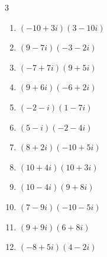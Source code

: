 \begin{multicols}{3}
\begin{enumerate}
        \phantom{$\displaystyle =25-53i$}

  \item $\displaystyle (-10+3i)(3-10i)$

        \phantom{$\displaystyle =109i$}

  \item $\displaystyle (9-7i)(-3-2i)$

        \phantom{$\displaystyle =-41+3i$}

  \item $\displaystyle (-7+7i)(9+5i)$

        \phantom{$\displaystyle =-98+28i$}

  \item $\displaystyle (9+6i)(-6+2i)$

        \phantom{$\displaystyle =-66-18i$}

  \item $\displaystyle (-2-i)(1-7i)$

        \phantom{$\displaystyle =-9+13i$}

  \item $\displaystyle (5-i)(-2-4i)$

        \phantom{$\displaystyle =-14-18i$}

  \item $\displaystyle (8+2i)(-10+5i)$

        \phantom{$\displaystyle =-90+20i$}

  \item $\displaystyle (10+4i)(10+3i)$

        \phantom{$\displaystyle =88+70i$}

  \item $\displaystyle (10-4i)(9+8i)$

        \phantom{$\displaystyle =122+44i$}

\columnbreak %

\resetques

  \item $\displaystyle (7-9i)(-10-5i)$

        \phantom{$\displaystyle =-115+55i$}

  \item $\displaystyle (9+9i)(6+8i)$

        \phantom{$\displaystyle =-18+126i$}

  \item $\displaystyle (-8+5i)(4-2i)$

        \phantom{$\displaystyle =-22+36i$}


\end{enumerate}
\end{multicols}
